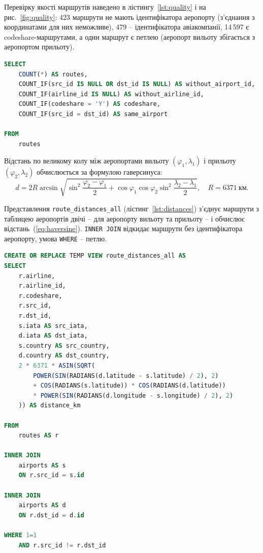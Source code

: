 \documentclass{iasa-lab}
\begin{document}

Перевірку якості маршрутів наведено в лістингу~\ref{lst:quality} і на рис.~\ref{fig:quality}: 423 маршрути не мають ідентифікатора аеропорту (з'єднання з координатами для них неможливе), 479 -- ідентифікатора авіакомпанії, 14\,597 є codeshare-маршрутами, а один маршрут є петлею (аеропорт вильоту збігається з аеропортом прильоту).

\noindent\begin{minipage}{\linewidth}
\begin{lstlisting}[language=SQL, caption={Перевірка якості маршрутів}, label={lst:quality}]
SELECT
    COUNT(*) AS routes,
    COUNT_IF(src_id IS NULL OR dst_id IS NULL) AS without_airport_id,
    COUNT_IF(airline_id IS NULL) AS without_airline_id,
    COUNT_IF(codeshare = 'Y') AS codeshare,
    COUNT_IF(src_id = dst_id) AS same_airport

FROM
    routes
\end{lstlisting}
\end{minipage}
\medskip


Відстань по великому колу між аеропортами вильоту $(\varphi_1, \lambda_1)$ і прильоту $(\varphi_2, \lambda_2)$ обчислюється за формулою гаверсинуса:
\begin{equation}\label{eq:haversine}
  d = 2R \arcsin\sqrt{\sin^2\frac{\varphi_2 - \varphi_1}{2} + \cos\varphi_1 \cos\varphi_2 \sin^2\frac{\lambda_2 - \lambda_1}{2}}, \quad R = 6371~\text{км}.
\end{equation}

Представлення \texttt{route\_distances\_all} (лістинг~\ref{lst:distances}) з'єднує маршрути з таблицею аеропортів двічі -- для аеропорту вильоту та прильоту -- і обчислює відстань~(\ref{eq:haversine}). \texttt{INNER JOIN} відкидає маршрути без ідентифікатора аеропорту, умова \texttt{WHERE} -- петлю.

\noindent\begin{minipage}{\linewidth}
\begin{lstlisting}[language=SQL, caption={Координати маршрутів і відстань за формулою гаверсинуса}, label={lst:distances}]
CREATE OR REPLACE TEMP VIEW route_distances_all AS
SELECT
    r.airline,
    r.airline_id,
    r.codeshare,
    r.src_id,
    r.dst_id,
    s.iata AS src_iata,
    d.iata AS dst_iata,
    s.country AS src_country,
    d.country AS dst_country,
    2 * 6371 * ASIN(SQRT(
        POWER(SIN(RADIANS(d.latitude - s.latitude) / 2), 2)
        + COS(RADIANS(s.latitude)) * COS(RADIANS(d.latitude))
        * POWER(SIN(RADIANS(d.longitude - s.longitude) / 2), 2)
    )) AS distance_km

FROM
    routes AS r

INNER JOIN
    airports AS s
    ON r.src_id = s.id

INNER JOIN
    airports AS d
    ON r.dst_id = d.id

WHERE 1=1
    AND r.src_id != r.dst_id
\end{lstlisting}
\end{minipage}
\medskip
\end{document}
